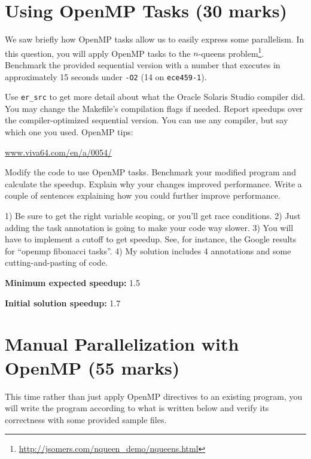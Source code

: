 \documentclass[letterpaper,10pt]{article}
\begin{document}
\section{Using OpenMP Tasks (30 marks)}

We saw briefly how OpenMP tasks allow us to easily express some parallelism.
In this question, you will apply OpenMP tasks to the $n$-queens
problem\footnote{\url{http://jsomers.com/nqueen_demo/nqueens.html}}.
Benchmark the provided sequential version with a number that executes in approximately
15 seconds under {\tt -O2} (14 on {\tt ece459-1}).

 Use {\tt er\_src} to get more detail about what the Oracle
Solaris Studio compiler did.  You may change the
Makefile's compilation flags if needed. Report speedups over the
compiler-optimized sequential version.  You can use any compiler, but
say which one you used. OpenMP tips:
\begin{center}
  \url{www.viva64.com/en/a/0054/}
\end{center}

Modify the code to use OpenMP tasks. Benchmark your modified program
and calculate the speedup. Explain why your
changes improved performance. Write a couple of sentences explaining how
you could further improve performance.

\vspace*{1em}
 1) Be sure to get the right variable scoping, or
you'll get race conditions. 2) Just adding the task annotation is going
to make your code way slower. 3) You will have to implement a cutoff to
get speedup. See, for instance, the Google results for ``openmp
fibonacci tasks''. 4) My solution includes 4 annotations and some
cutting-and-pasting of code.

\squishlist
  \item {\bf Minimum expected speedup:} 1.5
  \item {\bf Initial solution speedup:} 1.7
\squishend

\newpage

\section{Manual Parallelization with OpenMP (55 marks)}

This time rather than just apply OpenMP directives to an existing program, you will write the program according to what is written below and verify its correctness with some provided sample files.
\end{document}

